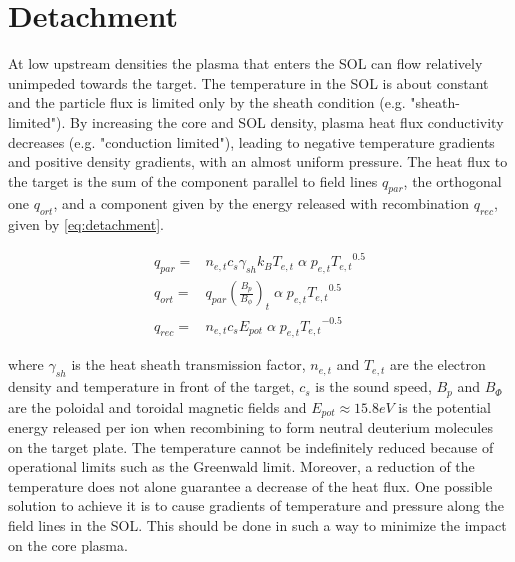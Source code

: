 \section{Detachment}\label{Detachment}

At low upstream densities the plasma that enters the SOL can flow relatively unimpeded towards the target. The temperature in the SOL is about constant and the particle flux is limited only by the sheath condition (e.g. "sheath-limited"). By increasing the core and SOL density, plasma heat flux conductivity decreases (e.g. "conduction limited"), leading to negative temperature gradients and positive density gradients, with an almost uniform pressure. The heat flux to the target is the sum of the component parallel to field lines $q_{par}$, the orthogonal one $q_{ort}$, and a component given by the energy released with recombination $q_{rec}$, given by  \autoref{eq:detachment}.

\begin{equation}
\begin{aligned}
{ q } _{ par } =& { n } _{ e,t } { c } _{ s } {  \gamma  } _{ sh }{ k } _{ B }{ T } _{ e,t } \; \alpha \; { p } _{ e,t }{{ T } _{ e,t }}^{0.5 } \\
{ q } _{ ort } =& { q } _{ par } \left( \frac {{ B } _{ p }} {{  B  }_{ \phi  }}   \right) _{ t} \; \alpha \; { p } _{ e,t }{{ T } _{ e,t }}^{0.5 } \\
{ q } _{ rec } =& { n } _{ e,t } { c } _{ s } {  E  } _{ pot } \; \alpha \; { p } _{ e,t }{{ T } _{ e,t }}^{-0.5 }
\end{aligned}
\label{eq:detachment}
\end{equation}

where $\gamma_{sh}$ is the heat sheath transmission factor, $n_{e,t}$ and $T_{e,t}$ are the electron density and temperature in front of the target, $c_s$ is the sound speed, $B_p$ and $B_{\Phi}$ are the poloidal and toroidal magnetic fields and $E_{pot} \approx 15.8 eV$ is the potential energy released per ion when recombining to form neutral deuterium molecules on the target plate. \cite{Reimold2015} The temperature cannot be indefinitely reduced because of operational limits such as the Greenwald limit.\cite{Greenwald1988} Moreover, a reduction of the temperature does not alone guarantee a decrease of the heat flux.  One possible solution to achieve it is to cause gradients of temperature and pressure along the field lines in the SOL. This should be done in such a way to minimize the impact on the core plasma.

